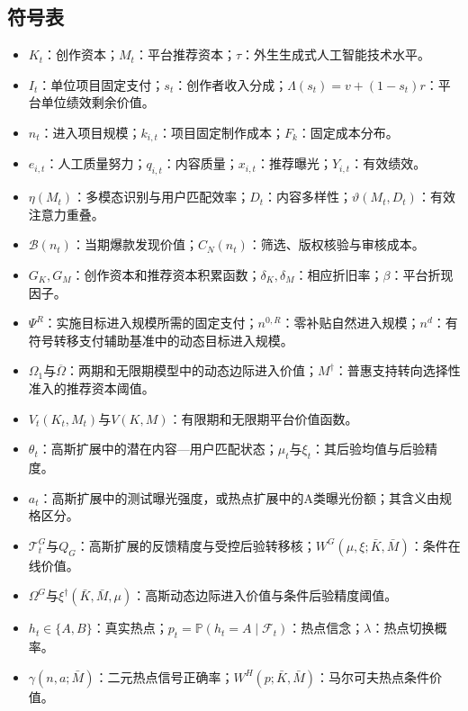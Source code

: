 \documentclass[UTF8, a4paper, 12pt, fontset=fandol]{ctexart}
\theoremstyle{definition}
\theoremstyle{remark}
\newcommand{\Prb}{\mathbb{P}}
\begin{document}
\begin{appendices}
\section{符号表}
\begin{itemize}
  \item $K_t$：创作资本；$M_t$：平台推荐资本；$\tau$：外生生成式人工智能技术水平。
  \item $I_t$：单位项目固定支付；$s_t$：创作者收入分成；$\Lambda(s_t)=v+(1-s_t)r$：平台单位绩效剩余价值。
  \item $n_t$：进入项目规模；$k_{i,t}$：项目固定制作成本；$F_k$：固定成本分布。
  \item $e_{i,t}$：人工质量努力；$q_{i,t}$：内容质量；$x_{i,t}$：推荐曝光；$Y_{i,t}$：有效绩效。
  \item $\eta(M_t)$：多模态识别与用户匹配效率；$D_t$：内容多样性；$\vartheta(M_t,D_t)$：有效注意力重叠。
  \item $\mathcal B(n_t)$：当期爆款发现价值；$C_N(n_t)$：筛选、版权核验与审核成本。
  \item $G_K,G_M$：创作资本和推荐资本积累函数；$\delta_K,\delta_M$：相应折旧率；$\beta$：平台折现因子。
  \item $\Psi^R$：实施目标进入规模所需的固定支付；$n^{0,R}$：零补贴自然进入规模；$n^d$：有符号转移支付辅助基准中的动态目标进入规模。
  \item $\Omega_1$与$\overline\Omega$：两期和无限期模型中的动态边际进入价值；$M^\dagger$：普惠支持转向选择性准入的推荐资本阈值。
  \item $V_t(K_t,M_t)$与$V(K,M)$：有限期和无限期平台价值函数。
  \item $\theta_t$：高斯扩展中的潜在内容---用户匹配状态；$\mu_t$与$\xi_t$：其后验均值与后验精度。
  \item $a_t$：高斯扩展中的测试曝光强度，或热点扩展中的A类曝光份额；其含义由规格区分。
  \item $\mathcal T_t^G$与$Q_G$：高斯扩展的反馈精度与受控后验转移核；$W^G(\mu,\xi;\bar K,\bar M)$：条件在线价值。
  \item $\Omega^G$与$\xi^\dagger(\bar K,\bar M,\mu)$：高斯动态边际进入价值与条件后验精度阈值。
  \item $h_t\in\{A,B\}$：真实热点；$p_t=\Prb(h_t=A\mid\mathcal F_t)$：热点信念；$\lambda$：热点切换概率。
  \item $\gamma(n,a;\bar M)$：二元热点信号正确率；$W^H(p;\bar K,\bar M)$：马尔可夫热点条件价值。
\end{itemize}


\end{appendices}
\end{document}
